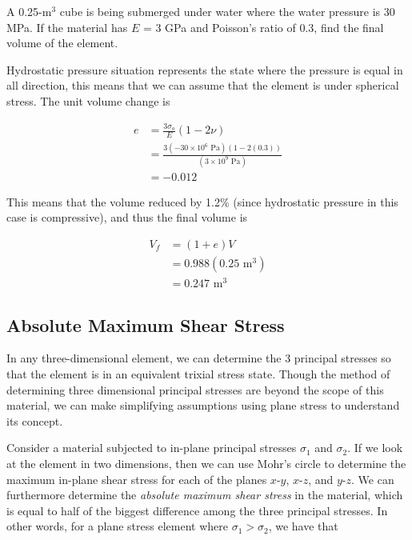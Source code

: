 \documentclass[
10pt,
a4paper,
openany,
svgnames,
]{book} %
\begin{document}
\begin{example}
A 0.25-m$^3$ cube is being submerged under water where the water pressure is 30 MPa. If the material has $E$ = 3 GPa and Poisson’s ratio of 0.3, find the final volume of the element.
\end{example}
\begin{solution}
Hydrostatic pressure situation represents the state where the pressure is equal in all direction, this means that we can assume that the element is under spherical stress. The unit volume change is

\begin{align*}
  e &= \frac{3\sigma_o}{E}(1 - 2\nu ) \\ 
    &= \frac{3(-30 \times 10^6 \text{ Pa})(1 - 2(0.3))}{(3 \times 10^9 \text{ Pa})} \\ 
    &= -0.012 
\end{align*}	

This means that the volume reduced by 1.2\% (since hydrostatic pressure in this case is compressive), and thus the final volume is

\begin{align*}
  V_f &= (1 + e)V \\ 
      &= 0.988(0.25 \text{ m}^3) \\ 
      &= 0.247 \text{ m}^3
\end{align*}

\end{solution}

\subsection{Absolute Maximum Shear Stress}

In any three-dimensional element, we can determine the 3 principal stresses so that the element is in an equivalent trixial stress state. Though the method of determining three dimensional principal stresses are beyond the scope of this material, we can make simplifying assumptions using plane stress to understand its concept.

Consider a material subjected to in-plane principal stresses $\sigma_1$ and $\sigma_2$. If we look at the element in two dimensions, then we can use Mohr's circle to determine the maximum in-plane shear stress for each of the planes $x$-$y$, $x$-$z$, and $y$-$z$. We can furthermore determine the \emph{absolute maximum shear stress} in the material, which is equal to half of the biggest difference among the three principal stresses. In other words, for a plane stress element where $\sigma_1 > \sigma_2$, we have that
\end{document}
